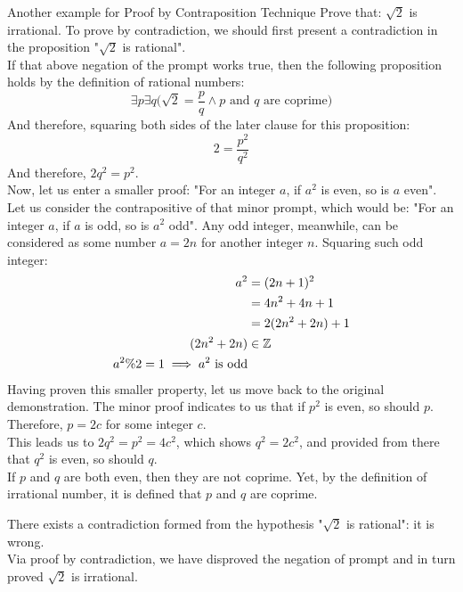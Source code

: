 \begin{ln-think}{Another example for Proof by Contraposition Technique}{}
    Prove that: $\sqrt{2}$ is irrational.
    \tcblower
    To prove by contradiction, we should first present a contradiction in the proposition "$\sqrt{2}$ is rational". \\
    If that above negation of the prompt works true, then the following proposition holds by the definition of rational numbers:
    \[\exists p \exists q \bigg( \sqrt{2} = \frac{p}{q} \land \text{$p$ and $q$ are coprime} \bigg)\]
    And therefore, squaring both sides of the later clause for this proposition:
    \[2 = \frac{p^2}{q^2}\]
    And therefore, $2q^2 = p^2$. \\
    Now, let us enter a smaller proof: "For an integer $a$, if $a^2$ is even, so is $a$ even". \\
    Let us consider the contrapositive of that minor prompt, which would be: "For an integer $a$, if $a$ is odd, so is $a^2$ odd". Any odd integer, meanwhile, can be considered as some number $a = 2n$ for another integer $n$. Squaring such odd integer:
    \begin{align*}
        a^2 &= (2n + 1)^2 \\
        &= 4n^2 + 4n + 1 \\
        &= 2(2n^2 + 2n) + 1 \\
        (2n^2 + 2n) &\in \mathbb{Z} \\
        a^2 \% 2 = 1 \implies \text{$a^2$ is odd}
    \end{align*}
    Having proven this smaller property, let us move back to the original demonstration. The minor proof indicates to us that if $p^2$ is even, so should $p$. Therefore, $p = 2c$ for some integer $c$.\\
    This leads us to $2q^2 = p^2 = 4c^2$, which shows $q^2 = 2c^2$, and provided from there that $q^2$ is even, so should $q$. \\
    If $p$ and $q$ are both even, then they are not coprime. Yet, by the definition of irrational number, it is defined that $p$ and $q$ are coprime. 
    
    There exists a contradiction formed from the hypothesis "$\sqrt{2}$ is rational": it is wrong. \\
    Via proof by contradiction, we have disproved the negation of prompt and in turn proved $\sqrt{2}$ is irrational. 
\end{ln-think}

